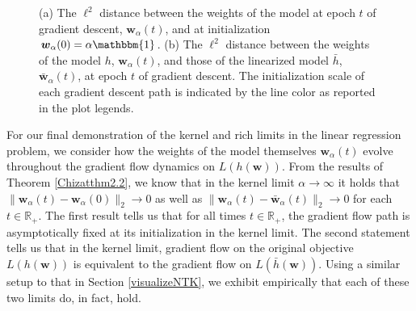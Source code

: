 \documentclass{article}
\begin{document}
\begin{figure}[H]
    \centering
    \hfill
    \caption{(a) The $\ell^2$ distance between the weights of the model at epoch $t$ of gradient descent, $\boldsymbol{w}_{\alpha}(t)$, and at initialization $\boldsymbol{w}_{\alpha}(0) = \alpha \mathbbm{1}$. (b) The $\ell^2$ distance between the weights of the model $h$, $\boldsymbol{w}_{\alpha}(t)$, and those of the linearized model $\bar{h}$, $\boldsymbol{\bar{w}}_{\alpha}(t)$, at epoch $t$ of gradient descent. The initialization scale of each gradient descent path is indicated by the line color as reported in the plot legends.}\label{fig:weights}
\end{figure}

For our final demonstration of the kernel and rich limits in the linear regression problem, we consider how the weights of the model themselves $\boldsymbol{w}_{\alpha}(t)$ evolve throughout the gradient flow dynamics on $L(h(\boldsymbol{w}))$. From the results of Theorem \ref{Chizatthm2.2}, we know that in the kernel limit $\alpha \rightarrow \infty$ it holds that $\| \boldsymbol{w}_{\alpha}(t) - \boldsymbol{w}_{\alpha}(0) \|_2 \rightarrow 0$ as well as $\| \boldsymbol{w}_{\alpha}(t) - \boldsymbol{\bar{w}}_{\alpha}(t) \|_2 \rightarrow 0$ for each $t \in \mathbb{R}_+$. The first result tells us that for all times $t \in \mathbb{R}_+$, the gradient flow path is asymptotically fixed at its initialization in the kernel limit. The second statement tells us that in the kernel limit, gradient flow on the original objective $L(h(\boldsymbol{w}))$ is equivalent to the gradient flow on $L(\bar{h}(\boldsymbol{w}))$. Using a similar setup to that in Section \ref{visualizeNTK}, we exhibit empirically that each of these two limits do, in fact, hold.
\end{document}
